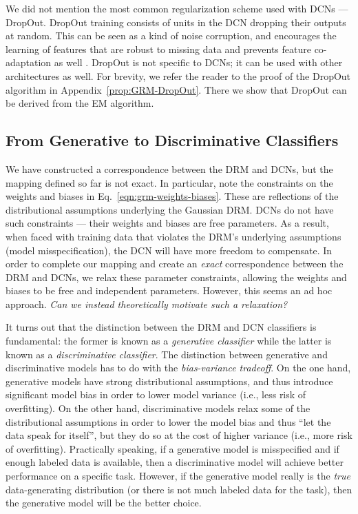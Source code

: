 \documentclass[12pt]{article}
\begin{document}
We did not mention the most common regularization scheme used with DCNs --- DropOut\cite{hinton2012improving}. DropOut training consists of units in the DCN dropping their outputs at random. This can be seen as a kind of noise corruption, and encourages the learning of features that are robust to missing data and prevents feature co-adaptation as well \cite{hinton2012improving, dahl2013improving}. DropOut is not specific to DCNs; it can be used with other architectures as well. For brevity, we refer the reader to the proof of the DropOut algorithm in Appendix~\ref{prop:GRM-DropOut}. There we show that DropOut can be derived from the EM algorithm.

\subsection{From Generative to Discriminative Classifiers} \label{sec:gen-to-discr}

We have constructed a correspondence between the DRM and DCNs, but the mapping defined so far is not exact. In particular, note the constraints on the weights and biases in Eq.~\ref{eqn:grm-weights-biases}. These are reflections of the distributional assumptions underlying the Gaussian DRM. DCNs do not have such constraints --- their weights and biases are free parameters. As a result, when faced with training data that violates the DRM's underlying assumptions (model misspecification), the DCN will have more freedom to compensate. 
In order to complete our mapping and create an \emph{exact} correspondence between the DRM and DCNs, we relax these parameter constraints, allowing the weights and biases to be free and independent parameters. However, this seems an ad hoc approach. \emph{Can we instead theoretically motivate such a relaxation?}

It turns out that the distinction between the DRM and DCN classifiers is fundamental: the former is known as a \emph{generative classifier} while the latter is known as a \emph{discriminative classifier}\cite{bishop2007generative, jordan2002discriminative}. The distinction between generative and discriminative models has to do with the \emph{bias-variance tradeoff}. On the one hand, generative models have strong distributional assumptions, and thus introduce significant model bias in order to lower model variance (i.e., less risk of overfitting). On the other hand, discriminative models relax some of the distributional assumptions in order to lower the model bias and thus ``let the data speak for itself'', but they do so at the cost of higher variance (i.e., more risk of overfitting)\cite{bishop2007generative, jordan2002discriminative}. Practically speaking, if a generative model is misspecified and if enough labeled data is available, then a discriminative model will achieve better performance on a specific task\cite{jordan2002discriminative}.  However, if the generative model really is the \emph{true} data-generating distribution (or there is not much labeled data for the task), then the generative model will be the better choice. 
\end{document}
